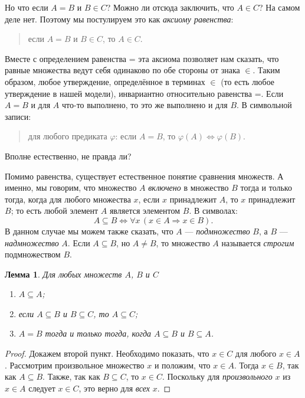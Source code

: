 \documentclass[12pt,notitlepage]{article}
\theoremstyle{plain}
\newtheorem{lemma}[thm]{Лемма}
\theoremstyle{definition}
\theoremstyle{plain}
\newcommand{\sbs}{\subseteq}
\renewcommand{\phi}{\varphi}
\newcommand{\1}{\mathbf{1}}
\newcommand{\0}{\mathbf{0}}
\newcommand{\ply}{\Longrightarrow}
\newcommand{\mcomm}[1]{}
\begin{document}
Но что если $A = B$ и $B \in C$? Можно ли отсюда заключить, что $A \in C$? На самом деле нет. Поэтому мы постулируем это как \emph{аксиому равенства}:
\begin{quote}
	если $A = B$ и $B \in C$, то $A \in C$.
\end{quote}
Вместе с определением равенства = эта аксиома позволяет нам сказать, что равные множества ведут себя одинаково по обе стороны от знака ${\in}$. Таким образом, любое утверждение, определённое в терминах ${\in}$ (то есть любое утверждение в нашей модели), инвариантно относительно равенства =. Если $A = B$ и для $A$ что-то выполнено, то это же выполнено и для $B$. В символьной записи:
\begin{quote}
	для любого предиката $\phi$: если $A = B$, то $\phi(A) \iff \phi(B)$.
\end{quote}
Вполне естественно, не правда ли?

\mcomm{Clearly, one needs some form of induction over `predicates' (or, better, formulas) $\phi$ in order to prove this statement; some metatheory is thus needed. On the other hand, we can easily prove it for every \emph{particular} $\phi$ below. So, we have decided to believe it without a proof. }

Помимо равенства, существует естественное понятие сравнения множеств. А именно, мы говорим, что множество $A$ \emph{включено} в множество $B$ тогда и только тогда, когда для любого множества $x$, если $x$ принадлежит $A$, то $x$ принадлежит $B$; то есть любой элемент $A$ является элементом $B$. В символах:
$$A \sbs B \iff \forall x\, (x \in A \ply x \in B).$$
В данном случае мы можем также сказать, что $A$ --- \emph{подмножество} $B$, а $B$ --- \emph{надмножество} $A$. Если $A \sbs B$, но $A \neq B$, то множество $A$ называется \emph{строгим} подмножеством $B$.

\begin{lemma}\label{ch0:subset}
	Для любых множеств $A$, $B$ и $C$
	\begin{enumerate}
		\item $A \sbs A$;
		\item если $A \sbs B$ и $B \sbs C$, то $A \sbs C$;
		\item $A = B$ тогда и только тогда, когда $A \sbs B$ и $B \sbs A$.
	\end{enumerate}
\end{lemma}
\begin{proof}
	Докажем второй пункт. Необходимо показать, что $x \in C$ для любого $x \in A$. Рассмотрим произвольное множество $x$ и положим, что $x \in A$. Тогда $x \in B$, так как $A \sbs B$. Также, так как $B \sbs C$, то $x \in C$. Поскольку для \emph{произвольного} $x$ из $x \in A$ следует $x \in C$, это верно для \emph{всех} $x$.
\end{proof}
\end{document}
